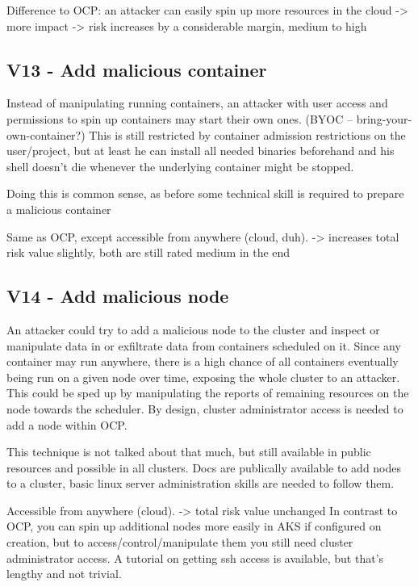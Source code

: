 Difference to OCP: an attacker can easily spin up more resources in the cloud -> more impact
-> risk increases by a considerable margin, medium to high

\subsection{V13 - Add malicious container}
Instead of manipulating running containers, an attacker with user access and permissions to spin up containers may start their own ones. (BYOC – bring-your-own-container?)
This is still restricted by container admission restrictions on the user/project, but at least he can install all needed binaries beforehand and his shell doesn’t die whenever the underlying container might be stopped.

Doing this is common sense, as before some technical skill is required to prepare a malicious container

Same as OCP, except accessible from anywhere (cloud, duh).
-> increases total risk value slightly, both are still rated medium in the end

\subsection{V14 - Add malicious node}
An attacker could try to add a malicious node to the cluster and inspect or manipulate data in or exfiltrate data from containers scheduled on it. Since any container may run anywhere, there is a high chance of all containers eventually being run on a given node over time, exposing the whole cluster to an attacker. This could be sped up by manipulating the reports of remaining resources on the node towards the scheduler.
By design, cluster administrator access is needed to add a node within OCP.

This technique is not talked about that much, but still available in public resources and possible in all clusters. Docs are publically available to add nodes to a cluster, basic linux server administration skills are needed to follow them.

Accessible from anywhere (cloud).
-> total risk value unchanged
In contrast to OCP, you can spin up additional nodes more easily in AKS if configured on creation, but to access/control/manipulate them you still need cluster administrator access.
A tutorial on getting ssh access is available, but that’s lengthy and not trivial.

